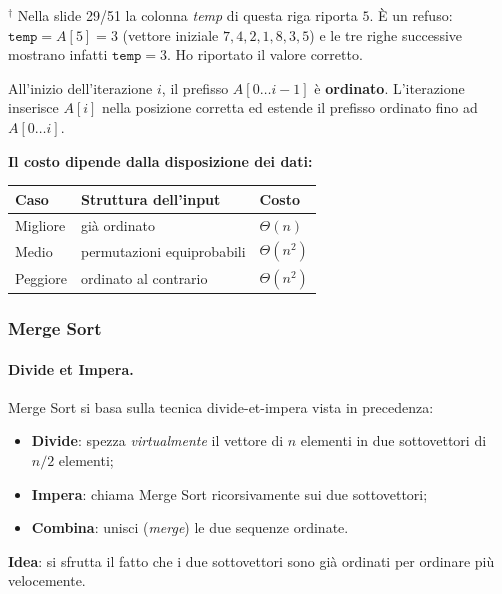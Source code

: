 \documentclass[12pt, a4paper]{article}
\begin{document}
\begin{tcolorbox}[colback=lightergray!5, colframe=tocsubsec, title=\textbf{Correzione di un Refuso nelle Slide}]
$^{\dagger}$ Nella slide 29/51 la colonna \textit{temp} di questa riga riporta $5$. È un refuso: $\texttt{temp}=A[5]=3$ (vettore iniziale $7,4,2,1,8,3,5$) e le tre righe successive mostrano infatti $\texttt{temp}=3$. Ho riportato il valore corretto.
\end{tcolorbox}

\begin{tcolorbox}[colback=lightergray!10, colframe=tocsec, title=\textbf{Invariante e Correttezza}]
All'inizio dell'iterazione $i$, il prefisso $A[0\ldots i-1]$ è \textbf{ordinato}. L'iterazione inserisce $A[i]$ nella posizione corretta ed estende il prefisso ordinato fino ad $A[0\ldots i]$.
\end{tcolorbox}

\textbf{Il costo dipende dalla disposizione dei dati:}
\begin{center}
\begin{tabular}{lll}
\toprule
\textbf{Caso} & \textbf{Struttura dell'input} & \textbf{Costo} \\
\midrule
\textcolor{green!50!black}{Migliore} & già ordinato & $\Theta(n)$ \\
\textcolor{orange!80!black}{Medio} & permutazioni equiprobabili & $\Theta(n^2)$ \\
\textcolor{red!70!black}{Peggiore} & ordinato al contrario & $\Theta(n^2)$ \\
\bottomrule
\end{tabular}
\end{center}

\subsubsection{Merge Sort}

\paragraph{Divide et Impera.}
Merge Sort si basa sulla tecnica divide-et-impera vista in precedenza:
\begin{itemize}
    \item \textbf{Divide}: spezza \textit{virtualmente} il vettore di $n$ elementi in due sottovettori di $n/2$ elementi;
    \item \textbf{Impera}: chiama Merge Sort ricorsivamente sui due sottovettori;
    \item \textbf{Combina}: unisci (\textit{merge}) le due sequenze ordinate.
\end{itemize}
\textbf{Idea}: si sfrutta il fatto che i due sottovettori sono già ordinati per ordinare più velocemente.
\end{document}
